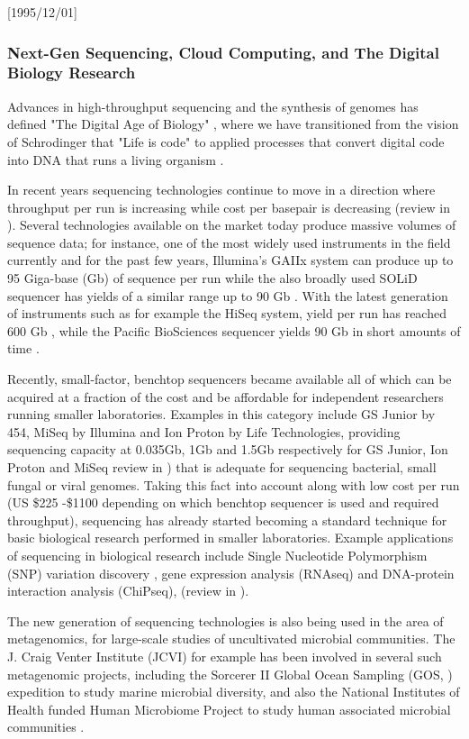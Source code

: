 \NeedsTeXFormat{LaTeX2e}[1995/12/01] \documentclass[10pt]{bmc_article}
\newenvironment{bmcformat}{\begin{raggedright}\baselineskip20pt\sloppy\setboolean{publ}{false}}{\end{raggedright}\baselineskip20pt\sloppy}
\begin{document}
\begin{bmcformat}
\subsubsection*{Next-Gen Sequencing, Cloud Computing, and The Digital Biology Research} 

Advances in high-throughput sequencing and the synthesis of genomes has defined "The Digital Age of Biology" 
\cite{venterdublin}, where we have transitioned from the vision of Schrodinger that "Life is code" \cite{Schrodinger1992} 
to applied processes that convert digital code into DNA that runs a living organism \cite{Gibson2010}.

In recent years sequencing technologies continue to move in a direction where throughput per run is increasing while cost
per basepair is decreasing (review in \cite{Mason2012}).  Several technologies available on the market today
produce massive volumes of sequence data; for instance, one of the most widely used instruments in the
field currently and for the past few years, Illumina's GAIIx system can produce up to 95 Giga-base (Gb) of 
sequence per run \cite{Illumina} while the also broadly used SOLiD sequencer has yields of a similar range up to
90 Gb \cite{solid5500}. With the latest generation of instruments such as for example the HiSeq system, yield
per run has reached 600 Gb \cite{Illumina}, while the Pacific BioSciences sequencer yields 90 Gb in short amounts
of time \cite{PacBio}. \pb

Recently, small-factor, benchtop sequencers became available all of which can be acquired at a fraction of the 
cost and be affordable for independent researchers running smaller laboratories. Examples in this category
include GS Junior by 454, MiSeq by Illumina and Ion Proton by Life Technologies, providing sequencing 
capacity at 0.035Gb, 1Gb and 1.5Gb respectively for GS Junior, Ion Proton and MiSeq review in \cite{Loman2012}) 
that is adequate for sequencing bacterial, small fungal or viral genomes. Taking this fact into account along with
low cost per run (US \$225 -\$1100 depending on which benchtop sequencer is used and required throughput), 
sequencing has already started becoming a standard technique for basic biological research performed in smaller
laboratories.  Example applications of sequencing in biological research include Single Nucleotide Polymorphism 
(SNP) variation discovery , gene expression analysis (RNAseq) and DNA-protein interaction analysis
(ChiPseq), (review in \cite{Mardis2008}).

The new generation of sequencing technologies is also being used in the area of metagenomics, for large-scale
studies of uncultivated microbial communities. The J.  Craig Venter Institute (JCVI) for example has been
involved in several such metagenomic projects, including the Sorcerer II Global Ocean Sampling (GOS,
\cite{Rusch2007}) expedition to study marine microbial diversity, and also the National Institutes of Health
funded Human Microbiome Project to study human associated microbial communities \cite{Nelson2010}. \pb


\end{bmcformat}
\end{document}
